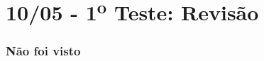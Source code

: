 \part{10/05 - 1\textsuperscript{o} Teste: Revisão}

\section{Não foi visto}

\begin{multicols}{2}



\end{multicols}